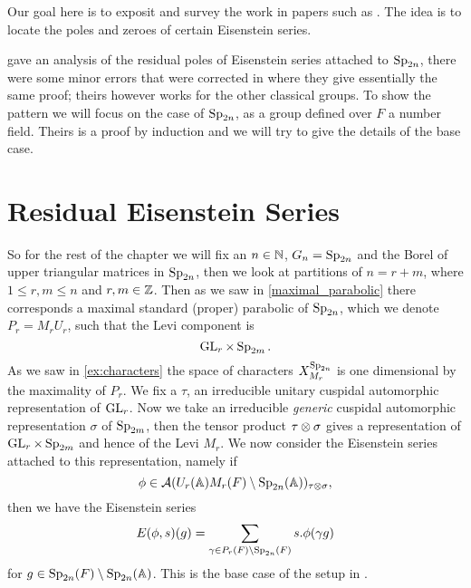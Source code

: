 \label{ch:jiang}
Our goal here is to exposit and survey the work in papers such as \cite{brennerNotesAnalyticProperties2009}\cite{jiangPolesCertainResidual2013}. The idea is to locate the poles and zeroes of certain Eisenstein series. 

\cite{brennerNotesAnalyticProperties2009} gave an analysis of the residual poles of Eisenstein series attached to \(\operatorname{Sp}_{2n}\), there were some minor errors that were corrected in \cite{jiangPolesCertainResidual2013} where they give essentially the same proof; theirs however works for the other classical groups. To show the pattern we will focus on the case of \(\operatorname{Sp}_{2n}\), as a group defined over \(F\) a number field. Theirs is a proof by induction and we will try to give the details of the base case. 

\section{Residual Eisenstein Series}
So for the rest of the chapter we will fix an \(n\in \N\), \(G_n = \operatorname{Sp}_{2n}\) and the Borel of upper triangular matrices in \(\operatorname{Sp}_{2n} \), then we look at partitions of \(n = r + m\), where \(1\leq r,m \leq n\) and \(r,m\in \Z\). Then as we saw in \ref{maximal_parabolic} there corresponds a maximal standard (proper) parabolic of \(\operatorname{Sp}_{2n}\), which we denote \(P_r = M_rU_r\), such that the Levi component is 
\[\operatorname{GL}_r\times \operatorname{Sp}_{2m}. \]
As we saw in \ref{ex:characters} the space of characters \(X^{\operatorname{Sp}_{2n}}_{M_r}\) is one dimensional by the maximality of \(P_r\). We fix a \(\tau\), an irreducible unitary cuspidal automorphic representation of \(\operatorname{GL}_r\). Now we take an irreducible \textit{generic} cuspidal automorphic representation \(\sigma\) of \(\operatorname{Sp}_{2m}\), then the tensor product \(\tau \otimes \sigma\) gives a representation of \(\operatorname{GL}_{r}\times \operatorname{Sp}_{2m}\) and hence of the Levi \(M_r\). We now consider the Eisenstein series attached to this representation, namely if 
\[\phi\in \mathcal{A}(U_r(\A)M_r(F)\setminus \Sp_{2n}(\A) )_{\tau\tensor \sigma},\] 
then we have the Eisenstein series
\[E(\phi, s)(g) = \sum_{\gamma\in P_r(F) \setminus \Sp_{2n}(F)} s.\phi(\gamma g)\]
for \(g\in \Sp_{2n}(F) \setminus \Sp_{2n}(\A)\). 
This is the base case of the setup in \cite{jiangPolesCertainResidual2013}.


